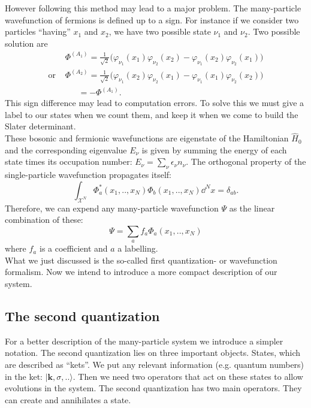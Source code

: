 \documentclass[../main.tex]{subfile}
\begin{document}
However following this method may lead to a major problem. The many-particle wavefunction of fermions is defined up to a sign. For instance if we consider
two particles ``having'' $x_1$ and $x_2$, we have two possible state $\nu_1$ and $\nu_2$. Two possible solution are
\begin{align*}
    &\Phi^{(A_1)} = \frac{1}{\sqrt{2}} \bigl(\varphi_{\nu_1} (x_1)\varphi_{\nu_2} (x_2) - \varphi_{\nu_1} (x_2)\varphi_{\nu_2} (x_1) \bigr)\\
    \text{or~} &\Phi^{(A_2)} = \frac{1}{\sqrt{2}} \bigl(\varphi_{\nu_1} (x_2)\varphi_{\nu_2}(x_1) - \varphi_{\nu_1} (x_1)\varphi_{\nu_2} (x_2)\bigr)\\
    &~~~~~~~=-\Phi^{(A_1)}.
\end{align*}
This sign difference may lead to computation errors. To solve this we must give a label to our states when we count them, and keep it when we 
come to build the Slater determinant.\\

These bosonic and fermionic wavefunctions are eigenstate of the Hamiltonian $\hat{H}_0$ and the corresponding eigenvalue $E_{\nu}$
is given by summing the energy of each state times its occupation number: $E_{\nu} = \sum_{\nu} \epsilon_{\nu} n_{\nu}$.
The orthogonal property of the single-particle wavefunction propagates itself:
\[
    \int_{\mathcal{X}^N} \Phi_a^{\ast}(x_1,..,x_N) \Phi_b(x_1,..,x_N) \dd^N x = \delta_{ab}.
\]
Therefore, we can expend any many-particle wavefunction $\Psi$ as the linear combination of these:
\[
    \Psi = \sum_a f_a \Phi_a(x_1,..,x_N)
\]
where $f_a$ is a coefficient and $a$ a labelling.\\

What we just discussed is the so-called first quantization- or wavefunction formalism. Now we intend to introduce a more compact description of our system. 

\subsection{The second quantization}
For a better description of the many-particle system we introduce a simpler notation. The second quantization lies on three important objects. 
States, which are described as ``kets''. We put any relevant information (e.g. quantum numbers) in the ket: $|\bm{k}, \sigma,..\rangle$. 
Then we need two operators that act on these states to allow evolutions in the system. 
The second quantization has two main operators. They can create and annihilates a state.\\
\end{document}
